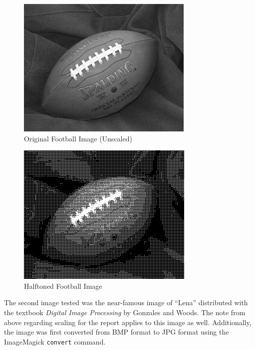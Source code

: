 \documentclass[11pt]{article}
\begin{document}
\begin{figure}[ht]
   \centering
   \includegraphics{../../imgin/football.jpg}
   \caption{Original Football Image (Unscaled)}
   \label{fig:football}
\end{figure}

\begin{figure}[ht]
   \centering
   \includegraphics{../../imgout/halftone-football33per.jpg}
   \caption{Halftoned Football Image}
   \label{fig:football-halftone}
\end{figure}

The second image tested was the near-famous image of ``Lena'' distributed with the textbook \textit{Digital Image Processing} by Gonzales and Woods. The note from above regarding scaling for the report applies to this image as well. Additionally, the image was first converted from BMP format to JPG format using the ImageMagick \texttt{convert} command.
\end{document}
